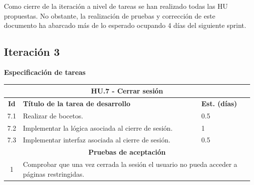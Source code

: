Como cierre de la iteración a nivel de tareas se han realizado todas las HU propuestas. No obstante, la realización de pruebas y corrección de este documento ha abarcado más de lo esperado ocupando 4 días del siguiente sprint.

\subsection{Iteración 3}

\textbf{Especificación de tareas}

\begin{tabular}{|c|p{9.5cm}|p{1cm}|}
	\hline
	\multicolumn{3}{|c|}{\textbf{HU.7 - Cerrar sesión}} \\
	\hline
	\textbf{Id} & \textbf{Título de la tarea de desarrollo} & \textbf{Est. (días)} \\
	\hline
	7.1 & Realizar de bocetos. & 0.5 \\ \hline
	7.2 &  Implementar la lógica asociada al cierre de sesión. & 1 \\ \hline
	7.3 &  Implementar interfaz asociada al cierre de sesión. & 0.5 \\ \hline
	\multicolumn{3}{|c|}{\textbf{Pruebas de aceptación}} \\ \hline
	1 & \multicolumn{2}{|p{10cm}|}{Comprobar que una vez cerrada la sesión el usuario no pueda acceder a páginas restringidas.} \\ \hline
\end{tabular} \\ \\

